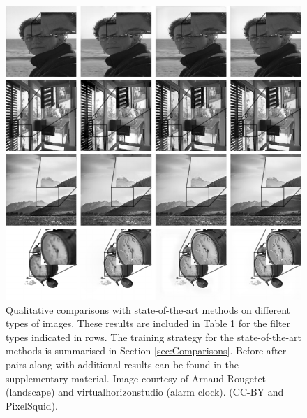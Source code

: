 \begin{figure}%
  \centering
  \includegraphics[width=.9\linewidth]{Chapters/detail-retouching-figs/Qualitative_zoomed_LLF_a2_s02.pdf}
    \caption{Qualitative comparisons with state-of-the-art methods on different types of images. These results are included in Table 1 for the filter types indicated in rows. The training strategy for the state-of-the-art methods is summarised in Section \ref{sec:Comparisons}. Before-after pairs along with additional results can be found in the supplementary material. Image courtesy of Arnaud Rougetet (landscape) and virtualhorizonstudio (alarm clock). (CC-BY and PixelSquid).} 

   \label{fig:QualitativeComp}%
\end{figure}


